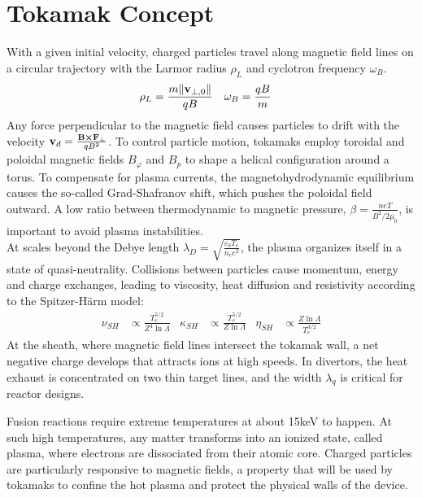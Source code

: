 \chapter{Tokamak Concept}
\label{chap:TokamakConcept}

\vfill
\begin{chaptersummarybox}
	With a given initial velocity, charged particles travel along magnetic field lines on a circular trajectory with the Larmor radius $\rho_L$ and cyclotron frequency $\omega_B$. 
	\begin{align*}
		\rho_L   &= \frac{m\norm{\mathbf{v}_{\perp,0}}}{qB} &
		\omega_B &= \frac{qB}{m}
	\end{align*}	
	Any force perpendicular to the magnetic field causes particles to drift with the velocity $\mathbf{v}_d = \frac{\mathbf{B}\cross\mathbf{F}_\perp}{qB^2}$. To control particle motion, tokamaks employ toroidal and poloidal magnetic fields $B_{\varphi}$ and $B_{p}$ to shape a helical configuration around a torus. To compensate for plasma currents, the magnetohydrodynamic equilibrium causes the so-called Grad-Shafranov shift, which pushes the poloidal field outward. A low ratio between thermodynamic to magnetic pressure, $\beta = \frac{neT}{B^2/2\mu_0}$, is important to avoid plasma instabilities. \\
	At scales beyond the Debye length $\lambda_D = \sqrt{\frac{\varepsilon_0T_e}{n_ee^2}}$, the plasma organizes itself in a state of quasi-neutrality. Collisions between particles cause momentum, energy and charge exchanges, leading to viscosity, heat diffusion and resistivity according to the Spitzer-Härm model:
	\begin{align*}
		\nu_{SH}    &\propto \frac{T_e^{5/2}}{Z^4 \ln \Lambda} &
		\kappa_{SH} &\propto \frac{T_e^{5/2}}{Z \ln \Lambda}   &
		\eta_{SH}   &\propto\frac{Z \ln \Lambda}{T_e^{3/2}}
	\end{align*}
	At the sheath, where magnetic field lines intersect the tokamak wall, a net negative charge develops that attracts ions at high speeds. In divertors, the heat exhaust is concentrated on two thin target lines, and the width $\lambda_q$ is critical for reactor designs.
\end{chaptersummarybox}
\vfill

\newpage

Fusion reactions require extreme temperatures at about 15keV to happen. At such high temperatures, any matter transforms into an ionized state, called plasma, where electrons are dissociated from their atomic core. Charged particles are particularly responsive to magnetic fields, a property that will be used by tokamaks to confine the hot plasma and protect the physical walls of the device. 


